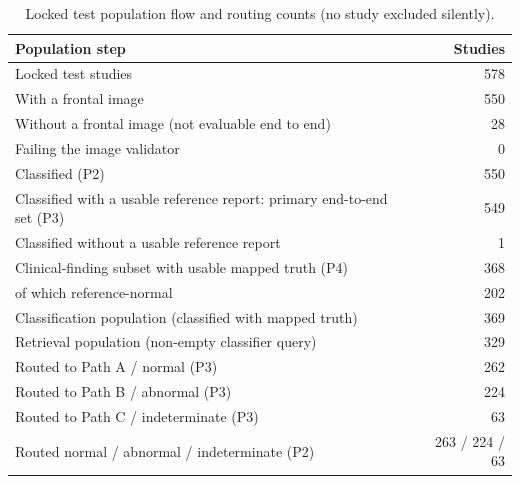 \begin{table}[t]
\centering
\scriptsize
\begin{tabular}{lr}
\hline
Population step & Studies \\
\hline
Locked test studies & 578 \\
With a frontal image & 550 \\
Without a frontal image (not evaluable end to end) & 28 \\
Failing the image validator & 0 \\
Classified (P2) & 550 \\
Classified with a usable reference report: primary end-to-end set (P3) & 549 \\
Classified without a usable reference report & 1 \\
Clinical-finding subset with usable mapped truth (P4) & 368 \\
  of which reference-normal & 202 \\
Classification population (classified with mapped truth) & 369 \\
Retrieval population (non-empty classifier query) & 329 \\
Routed to Path A / normal (P3) & 262 \\
Routed to Path B / abnormal (P3) & 224 \\
Routed to Path C / indeterminate (P3) & 63 \\
Routed normal / abnormal / indeterminate (P2) & 263 / 224 / 63 \\
\hline
\end{tabular}
\caption{Locked test population flow and routing counts (no study excluded silently).}
\label{tab:table1_locked_test_population}
\end{table}
